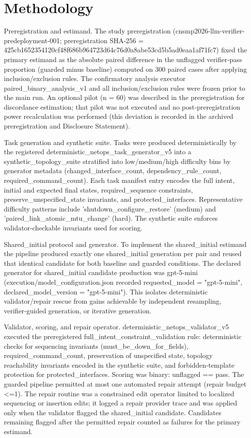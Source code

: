 \documentclass[conference]{IEEEtran}
\begin{document}
\section{Methodology}
Preregistration and estimand. The study preregistration (cnsmp2026-llm-verifier-predeployment-001; preregistration SHA‑256 = 425cb165\allowbreak{}2354120c\allowbreak{}f48f686b\allowbreak{}964723d6\allowbreak{}4c76d0a8\allowbreak{}abe53cd5\allowbreak{}b5ad0eaa\allowbreak{}1af71fc7) fixed the primary estimand as the absolute paired difference in the unflagged verifier‑pass proportion (guarded minus baseline) computed on 300 paired cases after applying inclusion/exclusion rules. The confirmatory analysis executor paired\_binary\_analysis\_v1 and all inclusion/exclusion rules were frozen prior to the main run. An optional pilot (n = 60) was described in the preregistration for discordance estimation; that pilot was not executed and no post‑preregistration power recalculation was performed (this deviation is recorded in the archived preregistration and Disclosure Statement).

Task generation and synthetic suite. Tasks were produced deterministically by the registered deterministic\_netops\_task\_generator\_v5 into a synthetic\_topology\_suite stratified into low/medium/high difficulty bins by generator metadata (changed\_interface\_count, dependency\_rule\_count, required\_command\_count). Each task manifest entry encodes the full intent, initial and expected final states, required\_sequence constraints, preserve\_unspecified\_state invariants, and protected\_interfaces. Representative difficulty patterns include 'shutdown\_configure\_restore' (medium) and 'paired\_link\_atomic\_mtu\_change' (hard). The synthetic suite enforces validator‑checkable invariants used for scoring.

Shared\_initial protocol and generator. To implement the shared\_initial estimand the pipeline produced exactly one shared\_initial generation per pair and reused that identical candidate for both baseline and guarded conditions. The declared generator for shared\_initial candidate production was gpt-5-mini (execution/model\_configuration.json recorded requested\_model = "gpt-5-mini", declared\_model\_version = "gpt-5-mini"). This isolates deterministic validator/repair rescue from gains achievable by independent resampling, verifier‑guided generation, or iterative generation.

Validator, scoring, and repair operator. deterministic\_netops\_validator\_v5 executed the preregistered full\_intent\_constraint\_validation rule: deterministic checks for sequencing invariants (must\_be\_down\_for\_fields), required\_command\_count, preservation of unspecified state, topology reachability invariants encoded in the synthetic suite, and forbidden‑template protection for protected\_interfaces. Scoring was binary: unflagged == pass. The guarded pipeline permitted at most one automated repair attempt (repair budget <=1). The repair routine was a constrained edit operator limited to localized sequencing or insertion edits; it logged a repair provider trace and was applied only when the validator flagged the shared\_initial candidate. Candidates remaining flagged after the permitted repair counted as failures for the primary estimand.
\end{document}
